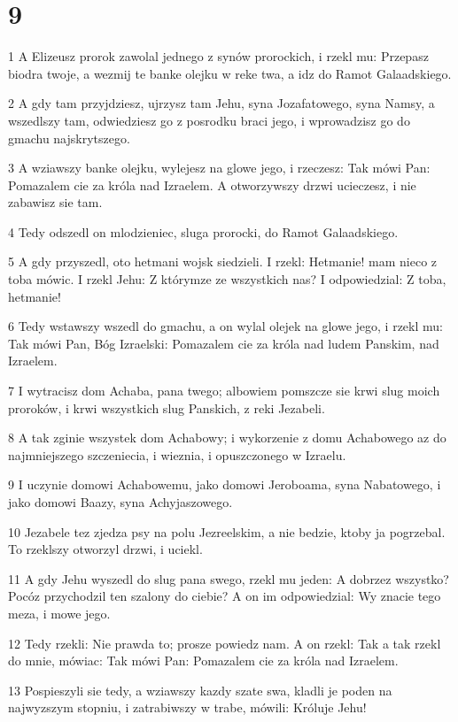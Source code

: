 \chapter{9}

\par 1 A Elizeusz prorok zawolal jednego z synów prorockich, i rzekl mu: Przepasz biodra twoje, a wezmij te banke olejku w reke twa, a idz do Ramot Galaadskiego.
\par 2 A gdy tam przyjdziesz, ujrzysz tam Jehu, syna Jozafatowego, syna Namsy, a wszedlszy tam, odwiedziesz go z posrodku braci jego, i wprowadzisz go do gmachu najskrytszego.
\par 3 A wziawszy banke olejku, wylejesz na glowe jego, i rzeczesz: Tak mówi Pan: Pomazalem cie za króla nad Izraelem. A otworzywszy drzwi ucieczesz, i nie zabawisz sie tam.
\par 4 Tedy odszedl on mlodzieniec, sluga prorocki, do Ramot Galaadskiego.
\par 5 A gdy przyszedl, oto hetmani wojsk siedzieli. I rzekl: Hetmanie! mam nieco z toba mówic. I rzekl Jehu: Z którymze ze wszystkich nas? I odpowiedzial: Z toba, hetmanie!
\par 6 Tedy wstawszy wszedl do gmachu, a on wylal olejek na glowe jego, i rzekl mu: Tak mówi Pan, Bóg Izraelski: Pomazalem cie za króla nad ludem Panskim, nad Izraelem.
\par 7 I wytracisz dom Achaba, pana twego; albowiem pomszcze sie krwi slug moich proroków, i krwi wszystkich slug Panskich, z reki Jezabeli.
\par 8 A tak zginie wszystek dom Achabowy; i wykorzenie z domu Achabowego az do najmniejszego szczeniecia, i wieznia, i opuszczonego w Izraelu.
\par 9 I uczynie domowi Achabowemu, jako domowi Jeroboama, syna Nabatowego, i jako domowi Baazy, syna Achyjaszowego.
\par 10 Jezabele tez zjedza psy na polu Jezreelskim, a nie bedzie, ktoby ja pogrzebal. To rzeklszy otworzyl drzwi, i uciekl.
\par 11 A gdy Jehu wyszedl do slug pana swego, rzekl mu jeden: A dobrzez wszystko? Pocóz przychodzil ten szalony do ciebie? A on im odpowiedzial: Wy znacie tego meza, i mowe jego.
\par 12 Tedy rzekli: Nie prawda to; prosze powiedz nam. A on rzekl: Tak a tak rzekl do mnie, mówiac: Tak mówi Pan: Pomazalem cie za króla nad Izraelem.
\par 13 Pospieszyli sie tedy, a wziawszy kazdy szate swa, kladli je poden na najwyzszym stopniu, i zatrabiwszy w trabe, mówili: Króluje Jehu!
